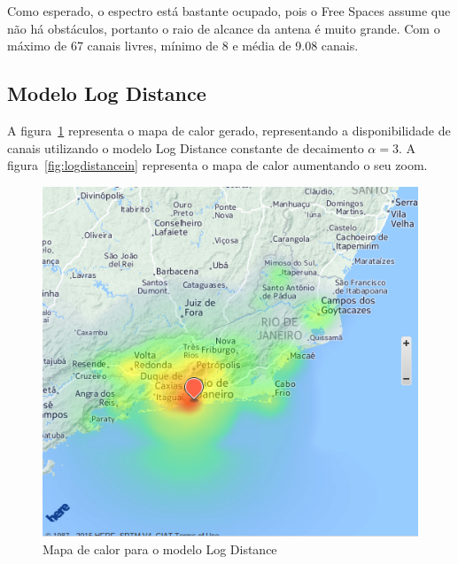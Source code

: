 \FloatBarrier

Como esperado, o espectro está bastante ocupado, pois o Free Spaces assume que não há obstáculos, portanto o raio de alcance da antena é muito grande. Com o máximo de 67 canais livres, mínimo de 8 e média de 9.08 canais.


\subsection{Modelo Log Distance}

A figura~\ref{fig:logdistanceout} representa o mapa de calor gerado, representando a disponibilidade de canais utilizando o modelo Log Distance constante de decaimento \begin{math}\alpha=3 \end{math}. A figura~\ref{fig:logdistancein} representa o mapa de calor aumentando o seu zoom.

\begin{figure}[htb]
\centering
\includegraphics[width=1.0\textwidth]{figs/logdistanceout}
\caption[Mapa de calor para o modelo Log Distance]
{Mapa de calor para o modelo Log Distance}
\label{fig:logdistanceout}
\end{figure} 

